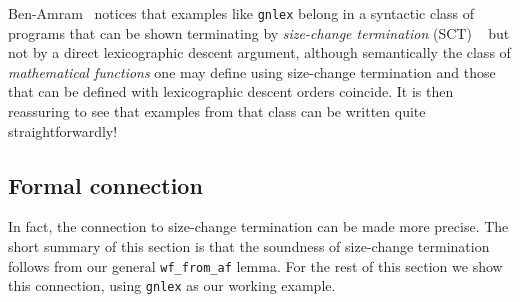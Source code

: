 \documentclass{llncs}
\begin{document}
Ben-Amram~\cite{Ben-amram02generalsize-change} notices that examples like \lstinline|gnlex| belong 
in a syntactic class of programs that can be shown terminating by {\em size-change termination} (SCT) ~\cite{Lee+:sct, jones-bohr,Ben-amram02generalsize-change}  
but not by a direct lexicographic descent argument, although semantically the class of {\em mathematical 
functions} one may define using size-change termination and those that can be defined with 
lexicographic descent orders coincide. It is then reassuring to see that examples from that 
class can be written quite straightforwardly!

\subsection{Formal connection}

In fact, the connection to size-change termination can be made more precise. The short 
summary of this section is that the soundness of size-change termination follows from our 
general \lstinline|wf_from_af| lemma. For the rest of this section we show this connection, 
using \lstinline|gnlex| as our working example. 
\end{document}
